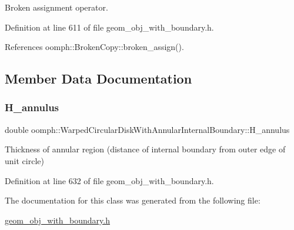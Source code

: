 Broken assignment operator. 



Definition at line 611 of file geom\+\_\+obj\+\_\+with\+\_\+boundary.\+h.



References oomph\+::\+Broken\+Copy\+::broken\+\_\+assign().



\subsection{Member Data Documentation}
\mbox{\label{classoomph_1_1WarpedCircularDiskWithAnnularInternalBoundary_a2c7fdc177314c535c7ad742ecae10204}} 
\subsubsection{\texorpdfstring{H\+\_\+annulus}{H\_annulus}}
{\footnotesize\ttfamily double oomph\+::\+Warped\+Circular\+Disk\+With\+Annular\+Internal\+Boundary\+::\+H\+\_\+annulus\hspace{0.3cm}{\ttfamily [protected]}}



Thickness of annular region (distance of internal boundary from outer edge of unit circle) 



Definition at line 632 of file geom\+\_\+obj\+\_\+with\+\_\+boundary.\+h.



The documentation for this class was generated from the following file\+:\begin{DoxyCompactItemize}
\item 
\hyperlink{geom__obj__with__boundary_8h}{geom\+\_\+obj\+\_\+with\+\_\+boundary.\+h}\end{DoxyCompactItemize}
